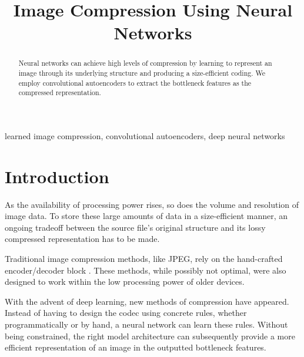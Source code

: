 \documentclass[conference]{IEEEtran}
\begin{document}
\title{Image Compression Using Neural Networks}

\author{
\and
{}
\and
{}
}

\maketitle

\begin{abstract}
Neural networks can achieve high levels of compression by learning to represent an image through its underlying structure and producing a size-efficient coding. We employ convolutional autoencoders to extract the bottleneck features as the compressed representation.
\end{abstract}


\begin{IEEEkeywords}
learned image compression, convolutional autoencoders, deep neural networks
\end{IEEEkeywords}


\section{Introduction}
As the availability of processing power rises, so does the volume and resolution of image data. To store these large amounts of data in a size-efficient manner, an ongoing tradeoff between the source file's original structure and its lossy compressed representation has to be made.

Traditional image compression methods, like JPEG, rely on the hand-crafted encoder/decoder block \cite{cheng_deep_2018}. These methods, while possibly not optimal, were also designed to work within the low processing power of older devices.

With the advent of deep learning, new methods of compression have appeared. Instead of having to design the codec using concrete rules, whether programmatically or by hand, a neural network can learn these rules. Without being constrained, the right model architecture can subsequently provide a more efficient representation of an image in the outputted bottleneck features. 
\end{document}
